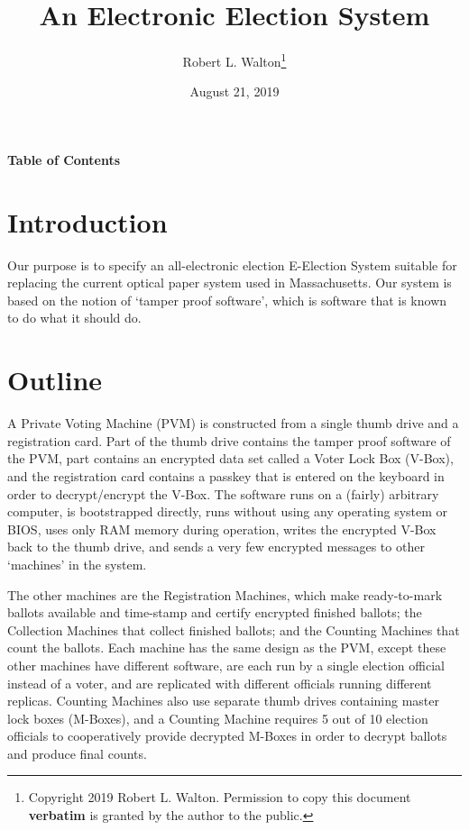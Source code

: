 \documentclass[12pt]{article}
\makeatletter
\renewcommand\tableofcontents{%
    \begin{list}{}%
	     {\setlength{\itemsep}{0in}%
	      \setlength{\topsep}{0in}%
	      \setlength{\parsep}{1ex}%
	      \setlength{\labelwidth}{0in}%
	      \setlength{\baselineskip}{1.5ex}%
	      \setlength{\leftmargin}{0.8in}%
	      \setlength{\rightmargin}{0.8in}}%
    \item\@starttoc{toc}%
    \end{list}}
\makeatother
\begin{document}
        
\title{An Electronic Election System}

\author{Robert L. Walton\thanks{Copyright 2019 Robert L. Walton.
Permission to copy this document {\bf verbatim} is granted by the author
to the public.}}

\date{August 21, 2019}

\maketitle

\begin{center}
\large \bf Table of Contents
\end{center}

\bigskip

\tableofcontents 

\newpage

\section{Introduction}

Our purpose is to specify an all-electronic election E-Election System
suitable for replacing the current optical paper system
used in Massachusetts.  Our system is based on the notion
of `tamper proof software', which is software that is
known to do what it should do.

\section{Outline}

A Private Voting Machine
(PVM) is constructed from a single thumb drive and a
registration card.  Part of the thumb drive contains the
tamper proof software of the PVM, part contains an encrypted
data set called a Voter Lock Box (V-Box), and the registration
card contains a passkey that is entered on the keyboard in
order to decrypt/encrypt the V-Box.  The software runs on
a (fairly) arbitrary computer, is bootstrapped directly,
runs without using any operating system or BIOS,
uses only RAM memory during operation,
writes the encrypted V-Box back to the thumb drive, and sends
a very few encrypted messages to other `machines' in the
system.

The other machines are the Registration Machines, which make
ready-to-mark ballots available and time-stamp and certify
encrypted finished ballots; the Collection Machines that collect
finished ballots; and the Counting Machines that count the
ballots.  Each machine has the same design as the PVM, except
these other machines have different software,
are each run by a single election official instead of a voter, and
are replicated with different officials running different
replicas.  Counting Machines also use separate
thumb drives containing master lock boxes
(M-Boxes), and a Counting Machine requires
5 out of 10 election officials to cooperatively
provide decrypted M-Boxes in order to decrypt ballots and
produce final counts.
\end{document}
